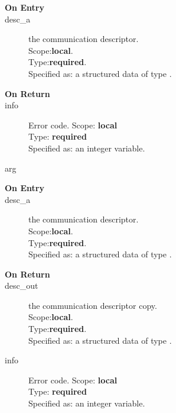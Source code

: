 
\begin{description}
\item[\bf On Entry]
\item[desc\_a] the communication descriptor.\\
Scope:{\bf local}.\\
Type:{\bf required}.\\
Specified as: a structured data of type \descdata.
\end{description}

\begin{description}
\item[\bf On Return]
\item[info] Error code.
Scope: {\bf local} \\
Type: {\bf required}\\
Specified as: an integer variable.
\item[arg] 
\end{description}



%
%


\begin{description}
\item[\bf On Entry]
\item[desc\_a] the communication descriptor.\\
Scope:{\bf local}.\\
Type:{\bf required}.\\
Specified as: a structured data of type \descdata.

\end{description}

\begin{description}
\item[\bf On Return]
\item[desc\_out] the communication descriptor copy.\\
Scope:{\bf local}.\\
Type:{\bf required}.\\
Specified as: a structured data of type \descdata.
\item[info] Error code.
Scope: {\bf local} \\
Type: {\bf required}\\
Specified as: an integer variable.\\
\end{description}


